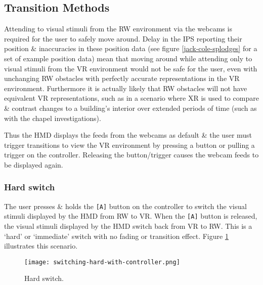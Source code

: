 
\subsection{Transition Methods}
Attending to visual stimuli from the RW environment via the webcams is required for the user to safely move around. Delay in the IPS reporting their position \& inaccuracies in these position data (see figure \ref{jack-cole-splodges} for a set of example position data) mean that moving around while attending only to visual stimuli from the VR environment would not be safe for the user, even with unchanging RW obstacles with perfectly accurate representations in the VR environment. Furthermore it is actually likely that RW obstacles will not have equivalent VR representations, such as in a scenario where XR is used to compare \& contrast changes to a building's interior over extended periods of time (such as with the chapel investigations).

Thus the HMD displays the feeds from the webcams as default \& the user must trigger transitions to view the VR environment by pressing a button or pulling a trigger on the controller. Releasing the button/trigger causes the webcam feeds to be displayed again.


\subsubsection{Hard switch}
\label{sub-hardswitch}
The user presses \& holds the \texttt{[A]} button on the controller to switch the visual stimuli displayed by the HMD from RW to VR. When the \texttt{[A]} button is released, the visual stimuli displayed by the HMD switch back from VR to RW. This is a `hard' or `immediate' switch with no fading or transition effect. Figure \ref{scenario1} illustrates this scenario.

\begin{figure}[h]
	\begin{center}
		\texttt{[image: switching-hard-with-controller.png]}
		\caption{Hard switch.}
		\label{scenario1}
	\end{center}
\end{figure}


